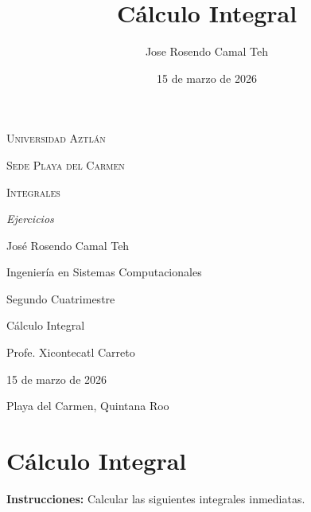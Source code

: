 \documentclass[letterpaper]{article}
\title{C\'alculo Integral}
\author{Jose Rosendo Camal Teh}
\date{15 de marzo de 2026}
\begin{document}
   
	\begin{titlepage}
	    \centering
	    {\scshape\LARGE Universidad Aztlán \par}
	    \vspace{1cm}
	    {\scshape\Large Sede Playa del Carmen \par}
	    \vspace{3cm}
	    {\scshape\Huge Integrales \par}
	    \vspace{1cm}
	    {\itshape\Large Ejercicios\par}
	    \vspace{3cm}
	    {\Large José Rosendo Camal Teh \par}
	    \vfill
	    {\Large Ingeniería en Sistemas Computacionales \par}
	    {\Large Segundo Cuatrimestre \par}
	    {\Large C\'alculo Integral \par}
	    \vfill
	    {\Large Profe. Xicontecatl Carreto \par}
	    \vfill
	    {\Large 15 de marzo de 2026 \par}
	    \vfill
	    {\Large Playa del Carmen, Quintana Roo \par}
	\end{titlepage}

	
	\section*{C\'alculo Integral}
	\textbf{Instrucciones:} Calcular las siguientes integrales inmediatas.
\end{document}
